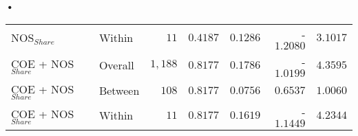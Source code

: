 \textbf{\textbf{•}}\documentclass[a4paper]{article}
\begin{document}
\begin{table}[h!]
\begin{tabular}{llrrrrr}
NOS$_{Share}$ & Within & $11$ & $0.4187$ & $0.1286$ & -$1.2080$ & $3.1017$ \\ 
COE + NOS$_{Share}$ & Overall & $1,188$ & $0.8177$ & $0.1786$ & -$1.0199$ & $4.3595$ \\ 
COE + NOS$_{Share}$ & Between & $108$ & $0.8177$ & $0.0756$ & $0.6537$ & $1.0060$ \\ 
COE + NOS$_{Share}$ & Within & $11$ & $0.8177$ & $0.1619$ & -$1.1449$ & $4.2344$ \\ 
\bottomrule
\end{tabular} 
\end{table} 
\FloatBarrier
\end{document}
